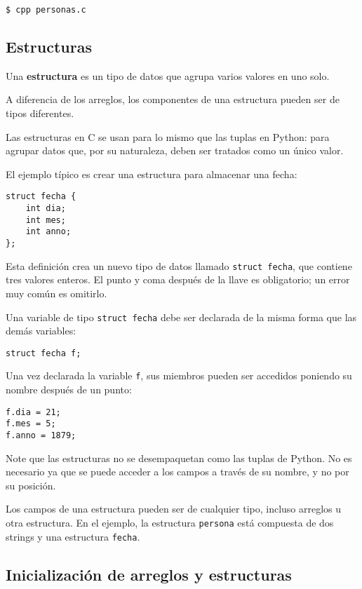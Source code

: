 \begin{lstlisting}
$ cpp personas.c
\end{lstlisting}

\subsection{Estructuras}

Una \textbf{estructura} es un tipo de datos que agrupa varios valores en
uno solo.

A diferencia de los arreglos, los componentes de una estructura pueden
ser de tipos diferentes.

Las estructuras en C se usan para lo mismo que las tuplas en Python:
para agrupar datos que, por su naturaleza, deben ser tratados como un
único valor.

El ejemplo típico es crear una estructura para almacenar una fecha:

\begin{lstlisting}
struct fecha {
    int dia;
    int mes;
    int anno;
};
\end{lstlisting}

Esta definición crea un nuevo tipo de datos llamado
\lstinline!struct fecha!, que contiene tres valores enteros. El punto y
coma después de la llave es obligatorio; un error muy común es omitirlo.

Una variable de tipo \lstinline!struct fecha! debe ser declarada de la
misma forma que las demás variables:

\begin{lstlisting}
struct fecha f;
\end{lstlisting}

Una vez declarada la variable \lstinline!f!, sus miembros pueden ser
accedidos poniendo su nombre después de un punto:

\begin{lstlisting}
f.dia = 21;
f.mes = 5;
f.anno = 1879;
\end{lstlisting}

Note que las estructuras no se desempaquetan como las tuplas de Python.
No es necesario ya que se puede acceder a los campos a través de su
nombre, y no por su posición.

Los campos de una estructura pueden ser de cualquier tipo, incluso
arreglos u otra estructura. En el ejemplo, la estructura
\lstinline!persona! está compuesta de dos strings y una estructura
\lstinline!fecha!.

\subsection{Inicialización de arreglos y estructuras}

